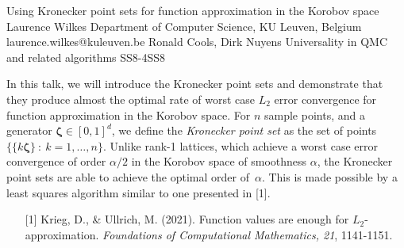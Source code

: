 \begin{talk}
  {Using Kronecker point sets for function approximation in the Korobov space}%
  {Laurence Wilkes}%
  {Department of Computer Science, KU Leuven, Belgium}%
  {laurence.wilkes@kuleuven.be}%
  {Ronald Cools, Dirk Nuyens}%
{Universality in QMC and related algorithms}
{}{SS8-4}{SS8}



In this talk, we will introduce the Kronecker point sets and demonstrate that they produce almost the optimal rate of worst case $L_2$ error convergence for function approximation in the Korobov space.
For $n$ sample points, and a generator $\boldsymbol{\zeta} \in [0, 1]^d$, we define the \emph{Kronecker point set} as the set of points $\{ \{ k \boldsymbol{\zeta} \} \: : \: k = 1, \ldots, n \}$.
Unlike rank-1 lattices, which achieve a worst case error convergence of order $\alpha/2$ in the Korobov space of smoothness $\alpha$, the Kronecker point sets are able to achieve the optimal order of~$\alpha$.
This is made possible by a least squares algorithm similar to one presented in [1]. %

 \medskip

 \begin{enumerate}%
     \item[{[1]}] Krieg, D., \& Ullrich, M. (2021). Function values are enough for \( L_2 \)-approximation. \textit{Foundations of Computational Mathematics, 21}, 1141-1151.
 \end{enumerate}
\quad
\end{talk}

